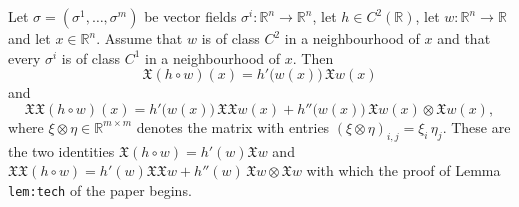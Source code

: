\begin{lemma}
Let $\sigma=(\sigma^1,\dots,\sigma^m)$ be vector fields $\sigma^i:\mathbb{R}^n\to\mathbb{R}^n$, let
$h\in C^2(\mathbb{R})$, let $w:\mathbb{R}^n\to\mathbb{R}$ and let $x\in\mathbb{R}^n$. Assume that
$w$ is of class $C^2$ in a neighbourhood of $x$ and that every $\sigma^i$ is of class $C^1$ in a
neighbourhood of $x$. Then
$$\mathfrak{X}(h\circ w)(x)=h'\big(w(x)\big)\,\mathfrak{X}w(x)$$
and
$$\mathfrak{X}\mathfrak{X}(h\circ w)(x)=h'\big(w(x)\big)\,\mathfrak{X}\mathfrak{X}w(x)
+h''\big(w(x)\big)\,\mathfrak{X}w(x)\otimes\mathfrak{X}w(x),$$
where $\xi\otimes\eta\in\mathbb{R}^{m\times m}$ denotes the matrix with entries
$(\xi\otimes\eta)_{i,j}=\xi_i\,\eta_j$. These are the two identities
$\mathfrak{X}(h\circ w)=h'(w)\mathfrak{X}w$ and $\mathfrak{X}\mathfrak{X}(h\circ
w)=h'(w)\mathfrak{X}\mathfrak{X}w+h''(w)\,\mathfrak{X}w\otimes\mathfrak{X}w$ with which the proof
of Lemma \texttt{lem:tech} of the paper begins.
\end{lemma}
